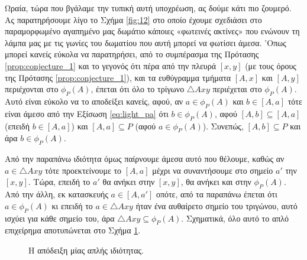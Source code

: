\documentclass[11pt,a4paper]{article}
\theoremstyle{definition}
\begin{document}
	Ωραία, τώρα που βγάλαμε την τυπική αυτή υποχρέωση, ας δούμε κάτι πιο ζουμερό. Ας παρατηρήσουμε λίγο το Σχήμα \ref{fig:12} στο οποίο έχουμε σχεδιάσει στο παραμορφωμένο αγαπημένο μας δωμάτιο κάποιες «φωτεινές ακτίνες» που ενώνουν τη λάμπα μας με τις γωνίες του δωματίου που αυτή μπορεί να φωτίσει άμεσα. 'Οπως μπορεί κανείς εύκολα να παρατηρήσει, από το συμπέρασμα της Πρότασης \ref{prop:conjecture_1} και το γεγονός ότι πέρα από την πλευρά $[x,y]$ (με τους όρους της Πρότασης \ref{prop:conjecture_1}), και τα ευθύγραμμα τμήματα $[A,x]$ και $[A,y]$ περιέχονται στο $\phi_P(A)$, έπεται ότι όλο το τρίγωνο $\triangle Axy$ περιέχεται στο $\phi_P(A)$. Αυτό είναι εύκολο να το αποδείξει κανείς, αφού, αν $a\in\phi_P(A)$ και $b\in[A,a]$ τότε είναι άμεσο από την Εξίσωση \eqref{eq:light_pa} ότι $b\in\phi_P(A)$, αφού $[A,b]\subseteq[A,a]$ (επειδή $b\in[A,a]$) και $[A,a]\subseteq P$ (αφού $a\in\phi_P(A)$). Συνεπώς, $[A,b]\subseteq P$ και άρα $b\in\phi_P(A)$.
	
	Από την παραπάνω ιδιότητα όμως παίρνουμε άμεσα αυτό που θέλουμε, καθώς αν $a\in\triangle Axy$ τότε προεκτείνουμε το $[A,a]$ μέχρι να συναντήσουμε στο σημείο $a'$ την $[x,y]$. Τώρα, επειδή το $a'$ θα ανήκει στην $[x,y]$, θα ανήκει και στην $\phi_P(A)$. Από την άλλη, εκ κατασκευής $a\in[A,a']$ οπότε, από τα παραπάνω έπεται ότι $a\in\phi_P(A)$ κι επειδή το $a\in\triangle Axy$ ήταν ένα αυθαίρετο σημείο του τριγώνου, αυτό ισχύει για κάθε σημείο του, άρα $\triangle Axy\subseteq\phi_P(A)$. Σχηματικά, όλο αυτό το απλό επιχείρημα αποτυπώνεται στο Σχήμα \ref{fig:13}.
	
	\begin{figure}[!htb]
		\centering
		\caption{Η απόδειξη μίας απλής ιδιότητας.}
		\label{fig:13}
	\end{figure}
\end{document}
